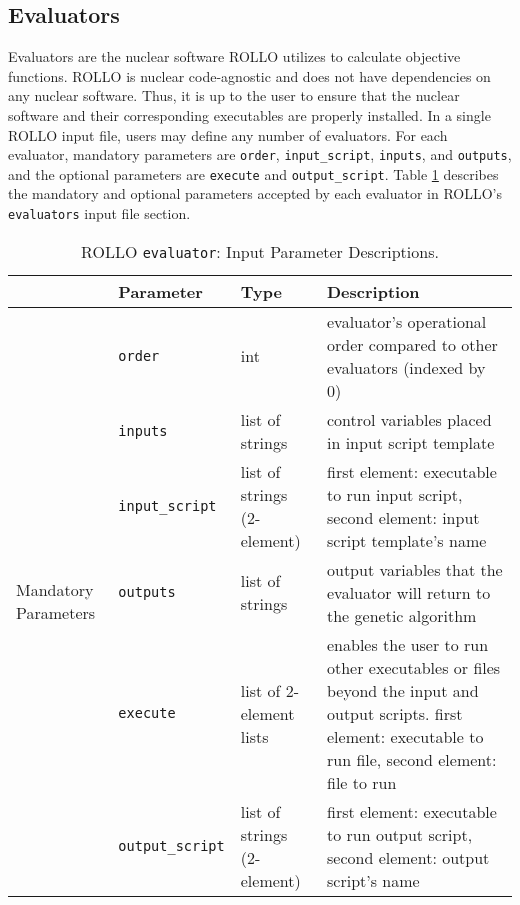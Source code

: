 \subsection{Evaluators}
Evaluators are the nuclear software \gls{ROLLO} utilizes to calculate objective functions. 
\gls{ROLLO} is nuclear code-agnostic and does not have dependencies on any 
nuclear software.
Thus, it is up to the user to ensure that the nuclear software and their corresponding 
executables are properly installed. 
In a single \gls{ROLLO} input file, users may define any number of evaluators. 
For each evaluator, mandatory parameters are \texttt{order}, \texttt{input\_script}, 
\texttt{inputs}, and \texttt{outputs}, and the optional parameters are
\texttt{execute} and \texttt{output\_script}. 
Table \ref{tab:evaluator-inputs} describes the mandatory and optional parameters 
accepted by each evaluator in ROLLO's \texttt{evaluators} input file section.  
\begin{table}[]
    \centering
    \onehalfspacing
    \caption{\acrfull{ROLLO} \texttt{evaluator}: Input Parameter Descriptions.}
	\label{tab:evaluator-inputs}
    \footnotesize
    \begin{tabular}{l|lp{2.5cm}p{7cm}}
    \hline
    & \textbf{Parameter} & \textbf{Type} & \textbf{Description} \\
    \hline
    \multirow{9}{2cm}{Mandatory Parameters} & \texttt{order} & int 
    & evaluator's operational order compared to other evaluators (indexed by 0) \\
    \cline{2-4}
    & \texttt{inputs} & list of strings & control variables placed in input script template \\
    \cline{2-4}
    & \texttt{input\_script} & list of strings (2-element) & first element: executable to run input script, 
    second element: input script template's name \\
    \cline{2-4}
    & \texttt{outputs} & list of strings & output variables that the evaluator will return to the genetic algorithm \\
    \hline
    \multirow{4}{2cm}{Optional Parameters} & \texttt{execute} & list of 2-element lists &
    enables the user to run other executables or files beyond the input and output scripts. first element: executable to run file, 
    second element: file to run \\
    \cline{2-4}
    & \texttt{output\_script} & list of strings (2-element) & first element: executable to run output script, 
    second element: output script's name \\
    \hline 
    \end{tabular}
    \end{table}

